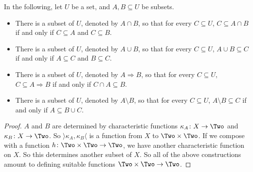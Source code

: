 \begin{lemma}
	In the following, let $U$ be a set, and $A,B\subseteq U$ be subsets.
	\begin{itemize}
		\item There is a subset of $U$, denoted by $A\cap B$, so that for every $C\subseteq U$, $C\subseteq A\cap B$ if and only if $C\subseteq A$ and $C\subseteq B$.
		\item There is a subset of $U$, denoted by $A\cup B$, so that for every $C\subseteq U$, $A\cup B\subseteq C$ if and only if $A\subseteq C$ and $B\subseteq C$.
		\item There is a subset of $U$, denoted by $A\Rightarrow B$, so that for every $C\subseteq U$, $C\subseteq A\Rightarrow B$ if and only if $C\cap A\subseteq B$.
		\item There is a subset of $U$, denoted by $A\setminus B$, so that for every $C\subseteq U$, $A\setminus B\subseteq C$ if and only if $A\subseteq B\cup C$.
	\end{itemize}
	
	\begin{proof}
		$A$ and $B$ are determined by characteristic functions $\fromto{\kappa_A}X\Two$ and $\fromto {\kappa_B}X\Two$.
		So $\rangle\kappa_A,\kappa_B\langle$ is a function from $X$ to $\Two\times \Two$. 
		If we compose with a function $\fromto h{\Two\times \Two}\Two$, we have another characteristic function on $X$. 
		So this determines another subset of $X$. So all of the above constructions amount to defining suitable functions $\Two\times\Two\to\Two$.
		

\end{proof}
\end{lemma}
